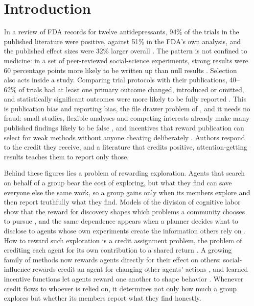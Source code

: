 \section{Introduction}
\label{sec:intro}

In a review of FDA records for twelve antidepressants, 94\% of the trials in the
published literature were positive, against 51\% in the FDA's own analysis, and
the published effect sizes were 32\% larger overall \citep{turner2008selective}.
The pattern is not confined to medicine: in a set of peer-reviewed
social-science experiments, strong results were 60 percentage points more likely
to be written up than null results \citep{franco2014publication}. Selection also
acts inside a study. Comparing trial protocols with their publications, 40--62\%
of trials had at least one primary outcome changed, introduced or omitted, and
statistically significant outcomes were more likely to be fully reported
\citep{dwan2008systematic}. This is publication bias and reporting bias, the
file drawer problem of \citet{rosenthal1979file}, and it needs no fraud: small
studies, flexible analyses and competing interests already make many published
findings likely to be false \citep{ioannidis2005why}, and incentives that reward
publication can select for weak methods without anyone cheating deliberately
\citep{smaldino2016natural}. Authors respond to the credit they receive, and a
literature that credits positive, attention-getting results teaches them to
report only those.

Behind these figures lies a problem of rewarding exploration. Agents that search
on behalf of a group bear the cost of exploring, but what they find can save
everyone else the same work, so a group gains only when its members explore and
then report truthfully what they find. Models of the division of cognitive labor show that
the reward for discovery shapes which problems a community chooses to pursue
\citep{kitcher1990division, strevens2003priority}, and the same dependence
appears when a planner decides what to disclose to agents whose own experiments
create the information others rely on \citep{kremer2014wisdom}. How to reward
such exploration is a credit assignment problem, the problem of crediting each
agent for its own contribution to a shared return \citep{foerster2018coma}. A
growing family of methods now rewards agents directly for their effect on others:
social-influence rewards credit an agent for changing other agents' actions
\citep{jaques2019social}, and learned incentive functions let agents reward one
another to shape behavior \citep{yang2020lio}. Whenever credit flows to whoever
is relied on, it determines not only how much a group explores but whether its
members report what they find honestly.

